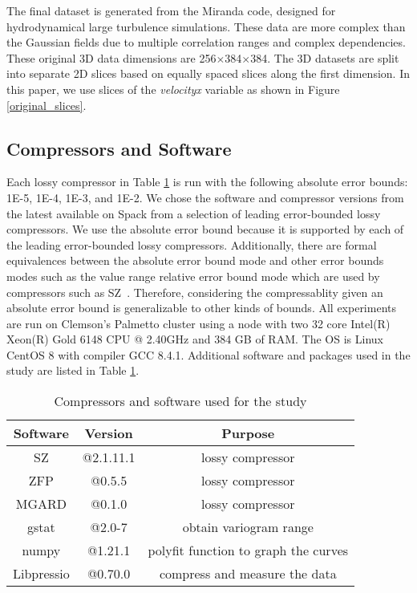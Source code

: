 \documentclass[conference]{IEEEtran}
\begin{document}
The final dataset is generated from the Miranda\cite{capello_zhao_di_tao_bessac_chen} code, designed for hydrodynamical large turbulence simulations. These data are more complex than the Gaussian fields due to multiple correlation ranges and complex dependencies. 
These original 3D data dimensions are 256$\times$384$\times$384. The 3D datasets are split into separate 2D slices based on equally spaced slices along the first dimension. In this paper, we use slices of the \textit{velocityx} variable as shown in Figure \ref{original_slices}. 




\subsection{Compressors and Software}\label{sec:compressor}
%
Each lossy compressor in Table \ref{tab:software} is run with the following absolute error bounds: 1E-5, 1E-4, 1E-3, and 1E-2.
We chose the software and compressor versions from the latest available on Spack from a selection of leading error-bounded lossy compressors.
We use the absolute error bound because it is supported by each of the leading error-bounded lossy compressors.
Additionally, there are formal equivalences between the absolute error bound mode and other error bounds modes such as the value range relative error bound mode which are used by compressors such as SZ~\cite{Liang2018}.
Therefore, considering the compressablity given an absolute error bound is generalizable to other kinds of bounds.
All experiments are run on Clemson's Palmetto cluster using a node with two 32 core Intel(R) Xeon(R) Gold 6148 CPU @ 2.40GHz and 384 GB of RAM. The OS is Linux CentOS 8 with compiler GCC 8.4.1. 
Additional software and packages used in the study are listed in Table \ref{tab:software}. 
%
\begin{table}
\begin{adjustbox}{center}
\begin{tabular}{ ccc }
\textbf{Software} & \textbf{Version} & \textbf{Purpose} \\\toprule
SZ\cite{Liang2018} & @2.1.11.1 & lossy compressor \\ 
ZFP\cite{Lindstrom2006} & @0.5.5 & lossy compressor \\
MGARD\cite{Ainsworth2019} & @0.1.0 & lossy compressor \\
gstat\cite{Pebesma2004} & @2.0-7 & obtain variogram range \\
numpy\cite{harris2020array} & @1.21.1 & polyfit function to graph the curves \\
Libpressio\cite{underwood_di_calhoun_cappello_2020} & @0.70.0 & compress and measure the data \\\bottomrule
\end{tabular}
\end{adjustbox}
\caption{Compressors and software used for the study}
\label{tab:software}
\vspace{-20pt}
\end{table}
%
\end{document}
